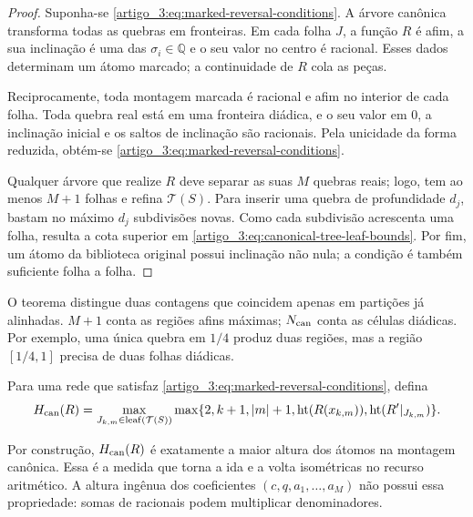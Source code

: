 \begin{proof}
Suponha-se \eqref{artigo_3:eq:marked-reversal-conditions}. A árvore canônica transforma
todas as quebras em fronteiras. Em cada folha $J$, a função $R$ é afim, a sua
inclinação é uma das $\sigma_i\in\mathbb Q$ e o seu valor no centro é racional.
Esses dados determinam um átomo marcado; a continuidade de $R$ cola as peças.

Reciprocamente, toda montagem marcada é racional e afim no interior de cada
folha. Toda quebra real está em uma fronteira diádica, e o seu valor em $0$, a
inclinação inicial e os saltos de inclinação são racionais. Pela unicidade da
forma reduzida, obtém-se \eqref{artigo_3:eq:marked-reversal-conditions}.

Qualquer árvore que realize $R$ deve separar as suas $M$ quebras reais; logo, tem
ao menos $M+1$ folhas e refina $\mathcal T(S)$. Para inserir uma quebra de
profundidade $d_j$, bastam no máximo $d_j$ subdivisões novas. Como cada
subdivisão acrescenta uma folha, resulta a cota superior em
\eqref{artigo_3:eq:canonical-tree-leaf-bounds}. Por fim, um átomo da biblioteca
original possui inclinação não nula; a condição é também suficiente folha a
folha.
\end{proof}

O teorema distingue duas contagens que coincidem apenas em partições já
alinhadas. $M+1$ conta as regiões afins máximas; $N_{\rm can}$ conta as células
diádicas. Por exemplo, uma única quebra em $1/4$ produz duas regiões, mas a
região $[1/4,1]$ precisa de duas folhas diádicas.

\begin{definition}\label{map:artigo_3:5.3}
\label{artigo_3:def:canonical-network-height}
Para uma rede que satisfaz \eqref{artigo_3:eq:marked-reversal-conditions}, defina
\begin{equation}
 H_{\rm can}(R)=
 \max_{J_{k,m}\in\operatorname{leaf}(\mathcal T(S))}
 \max\{2,k+1,|m|+1,\operatorname{ht}(R(x_{k,m})),\operatorname{ht}(R'|_{J_{k,m}})\}.
 \label{artigo_3:eq:canonical-network-height}
\end{equation}
\end{definition}

Por construção, $H_{\rm can}(R)$ é exatamente a maior altura dos átomos na
montagem canônica. Essa é a medida que torna a ida e a volta isométricas no
recurso aritmético. A altura ingênua dos coeficientes
$(c,q,a_1,\ldots,a_M)$ não possui essa propriedade: somas de racionais podem
multiplicar denominadores.

